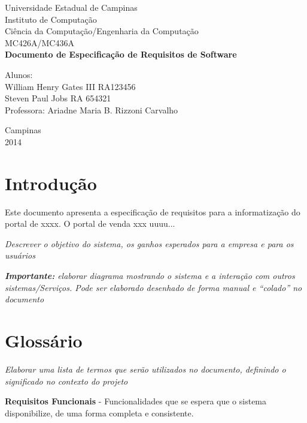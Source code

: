 \documentclass[12pt,twoside,a4paper]{article}
\begin{document}
\begin{titlepage}
\begin{center}
{\large Universidade Estadual de Campinas}\\[0.2cm]
{\large Instituto de Computação}\\[0.2cm]
{\large Ciência da Computação/Engenharia da Computação}\\[0.2cm]
{\large MC426A/MC436A}\\[5.1cm]
{\bf \huge Documento de Especificação de Requisitos de Software}\\[5.1cm]
\end{center}
{\large Alunos:\\William Henry Gates III RA123456\\ Steven Paul Jobs RA 654321}\\[0.7cm]
{\large Professora: Ariadne Maria B. Rizzoni Carvalho}\\[3.1cm]
\begin{center}
{\large Campinas}\\[0.2cm]
{\large 2014}
\end{center}
\end{titlepage}


\tableofcontents

\newpage

\section{Introdução}

Este documento apresenta a especificação de requisitos para a informatização do portal de xxxx.  O portal de venda xxx uuuu...

\textit{Descrever o objetivo do sistema, os ganhos esperados para a empresa e para os usuários}

\textit{\textbf{Importante:} elaborar diagrama mostrando o sistema e a interação com outros sistemas/Serviços. Pode ser elaborado desenhado de forma manual e “colado” no documento} 


\section{Glossário}
\textit{Elaborar uma lista de termos que serão utilizados no documento, definindo o significado no contexto do projeto}

\textbf{Requisitos Funcionais} - Funcionalidades que se espera que o sistema disponibilize, de uma forma completa e consistente.
\end{document}

